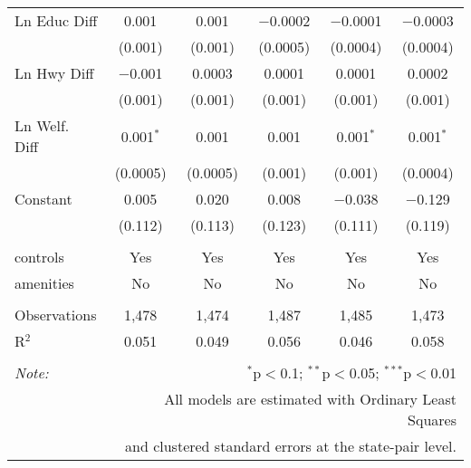 \begin{table}[!htbp]
\begin{tabular}{@{\extracolsep{5pt}}lccccc}
  Ln Educ Diff & 0.001 & 0.001 & $-$0.0002 & $-$0.0001 & $-$0.0003 \\ 
  & (0.001) & (0.001) & (0.0005) & (0.0004) & (0.0004) \\ 
  Ln Hwy Diff & $-$0.001 & 0.0003 & 0.0001 & 0.0001 & 0.0002 \\ 
  & (0.001) & (0.001) & (0.001) & (0.001) & (0.001) \\ 
  Ln Welf. Diff & 0.001$^{*}$ & 0.001 & 0.001 & 0.001$^{*}$ & 0.001$^{*}$ \\ 
  & (0.0005) & (0.0005) & (0.001) & (0.001) & (0.0004) \\ 
  Constant & 0.005 & 0.020 & 0.008 & $-$0.038 & $-$0.129 \\ 
  & (0.112) & (0.113) & (0.123) & (0.111) & (0.119) \\ 
 \hline \\[-1.8ex] 
controls & Yes & Yes & Yes & Yes & Yes \\ 
amenities & No & No & No & No & No \\ 
\hline \\[-1.8ex] 
Observations & 1,478 & 1,474 & 1,487 & 1,485 & 1,473 \\ 
R$^{2}$ & 0.051 & 0.049 & 0.056 & 0.046 & 0.058 \\ 
\hline 
\hline \\[-1.8ex] 
\textit{Note:}  & \multicolumn{5}{r}{$^{*}$p$<$0.1; $^{**}$p$<$0.05; $^{***}$p$<$0.01} \\ 
 & \multicolumn{5}{r}{All models are estimated with Ordinary Least Squares} \\ 
 & \multicolumn{5}{r}{and clustered standard errors at the state-pair level.} \\ 
\end{tabular} 
\end{table} 
